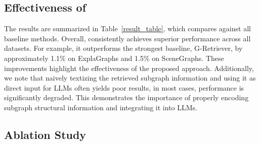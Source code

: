 




\subsection{Effectiveness of \myModel}

The results are summarized in Table~\ref{result_table}, which compares \myModel{} against all baseline methods. Overall, \myModel{} consistently achieves superior performance across all datasets. For example, it outperforms the strongest baseline, G-Retriever, by approximately 1.1\% on ExplaGraphs and 1.5\% on SceneGraphs. These improvements highlight the effectiveness of the proposed approach.
Additionally, we note that naively textizing the retrieved subgraph information and using it as direct input for LLMs often yields poor results, in most cases, performance is significantly degraded. This demonstrates the importance of properly encoding subgraph structural information and integrating it into LLMs.

\subsection{Ablation Study}

